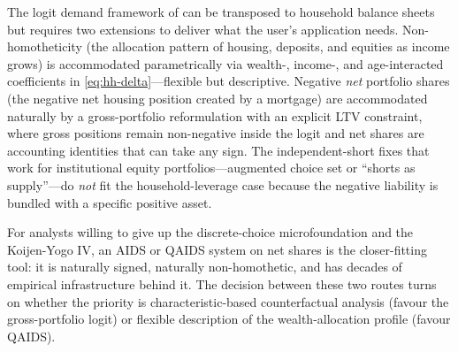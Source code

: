 \documentclass[11pt,a4paper]{article}
\begin{document}
The logit demand framework of \citet{koijen2019demand} can be
transposed to household balance sheets but requires two extensions to
deliver what the user's application needs. Non-homotheticity (the
allocation pattern of housing, deposits, and equities as income grows)
is accommodated parametrically via wealth-, income-, and age-interacted
coefficients in \eqref{eq:hh-delta}---flexible but descriptive.
Negative \emph{net} portfolio shares (the negative net housing position
created by a mortgage) are accommodated naturally by a
gross-portfolio reformulation with an explicit LTV constraint, where
gross positions remain non-negative inside the logit and net shares are
accounting identities that can take any sign. The independent-short
fixes that work for institutional equity portfolios---augmented choice
set or ``shorts as supply''---do \emph{not} fit the household-leverage
case because the negative liability is bundled with a specific positive
asset.

For analysts willing to give up the discrete-choice microfoundation and
the Koijen-Yogo IV, an AIDS or QAIDS system on net shares is the
closer-fitting tool: it is naturally signed, naturally non-homothetic,
and has decades of empirical infrastructure behind it. The decision
between these two routes turns on whether the priority is characteristic-based
counterfactual analysis (favour the gross-portfolio logit) or flexible
description of the wealth-allocation profile (favour QAIDS).



\end{document}

